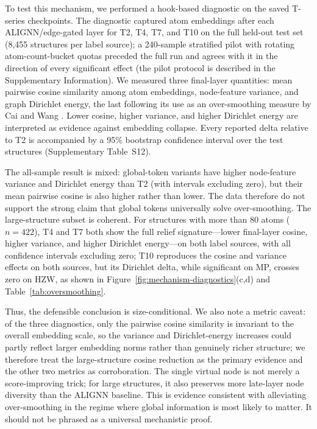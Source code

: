 \documentclass[a4paper,11pt]{article}
\begin{document}
To test this mechanism, we performed a hook-based diagnostic on the saved T-series checkpoints. The diagnostic captured atom embeddings after each ALIGNN/edge-gated layer for T2, T4, T7, and T10 on the full held-out test set (8,455 structures per label source); a 240-sample stratified pilot with rotating atom-count-bucket quotas preceded the full run and agrees with it in the direction of every significant effect (the pilot protocol is described in the Supplementary Information). We measured three final-layer quantities: mean pairwise cosine similarity among atom embeddings, node-feature variance, and graph Dirichlet energy, the last following its use as an over-smoothing measure by Cai and Wang \cite{cai2020note}. Lower cosine, higher variance, and higher Dirichlet energy are interpreted as evidence against embedding collapse. Every reported delta relative to T2 is accompanied by a 95\% bootstrap confidence interval over the test structures (Supplementary Table~S12).

The all-sample result is mixed: global-token variants have higher node-feature variance and Dirichlet energy than T2 (with intervals excluding zero), but their mean pairwise cosine is also higher rather than lower. The data therefore do not support the strong claim that global tokens universally solve over-smoothing. The large-structure subset is coherent. For structures with more than 80 atoms (\(n=422\)), T4 and T7 both show the full relief signature---lower final-layer cosine, higher variance, and higher Dirichlet energy---on both label sources, with all confidence intervals excluding zero; T10 reproduces the cosine and variance effects on both sources, but its Dirichlet delta, while significant on MP, crosses zero on HZW, as shown in Figure~\ref{fig:mechanism-diagnostics}(c,d) and Table~\ref{tab:oversmoothing}.

Thus, the defensible conclusion is size-conditional. We also note a metric caveat: of the three diagnostics, only the pairwise cosine similarity is invariant to the overall embedding scale, so the variance and Dirichlet-energy increases could partly reflect larger embedding norms rather than genuinely richer structure; we therefore treat the large-structure cosine reduction as the primary evidence and the other two metrics as corroboration. The single virtual node is not merely a score-improving trick; for large structures, it also preserves more late-layer node diversity than the ALIGNN baseline. This is evidence consistent with alleviating over-smoothing in the regime where global information is most likely to matter. It should not be phrased as a universal mechanistic proof.
\end{document}
